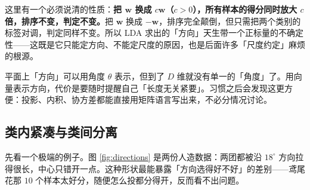 \documentclass[11pt,a4paper,fontset=windows,zihao=-4]{ctexart}
\newcommand{\bw}{\mathbf{w}}
\begin{document}
这里有一个必须说清的性质：\textbf{把 $\bw$ 换成 $c\bw$（$c>0$），所有样本的得分同时放大 $c$ 倍，排序不变，判定不变。}把 $\bw$ 换成 $-\bw$，排序完全颠倒，但只需把两个类别的标签对调，判定同样不变。所以 LDA 求出的「方向」天生带一个正标量的不确定性——这既是它只能定方向、不能定尺度的原因，也是后面许多「尺度约定」麻烦的根源。

\begin{add}[为什么不用角度而用向量]
平面上「方向」可以用角度 $\theta$ 表示，但到了 $D$ 维就没有单一的「角度」了。用向量表示方向，代价是要随时提醒自己「长度无关紧要」。习惯之后会发现这更方便：投影、内积、协方差都能直接用矩阵语言写出来，不必分情况讨论。
\end{add}

\subsection{类内紧凑与类间分离}

先看一个极端的例子。图 \ref{fig:directions} 是两份人造数据：两团都被沿 $18^\circ$ 方向拉得很长，中心只错开一点。这种形状最能暴露「方向选得好不好」的差别——鸢尾花那 $10$ 个样本太好分，随便怎么投都分得开，反而看不出问题。
\end{document}
